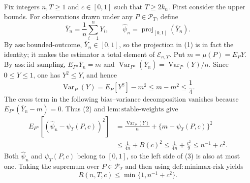 Fix integers \(n,T\geq 1\) and \(c\in[0,1]\) such that \(T\geq 2k_n\).  First consider the upper bounds.  For observations drawn under any \(P\in\mathcal P_T\), define
\[
\overline Y_n=\frac1n\sum_{i=1}^nY_i,
\qquad
\widehat\psi_n=\operatorname{proj}_{[0,1]}(\overline Y_n).
\tag{1}
\]
By \(\mathrm{ass:bounded\text{-}outcome}\), \(\overline Y_n\in[0,1]\), so the projection in (1) is in fact the identity; it makes the estimator a total element of \(\mathcal E_{n,T}\).  Put \(m=\mu(P)=E_PY\).  By \(\mathrm{ass:iid\text{-}sampling}\), \(E_{P^n}\overline Y_n=m\) and \(\operatorname{Var}_{P^n}(\overline Y_n)=\operatorname{Var}_P(Y)/n\).  Since \(0\leq Y\leq1\), one has \(Y^2\leq Y\), and hence
\[
\operatorname{Var}_P(Y)=E_P[Y^2]-m^2
\leq m-m^2\leq\frac14.
\tag{2}
\]
The cross term in the following bias--variance decomposition vanishes because \(E_{P^n}(\overline Y_n-m)=0\).  Thus (2) and \(\mathrm{lem:stable\text{-}weights}\) give
\[
\begin{aligned}
E_{P^n}\!\left[(\widehat\psi_n-\psi_T(P,c))^2\right]
&=\frac{\operatorname{Var}_P(Y)}n+\{m-\psi_T(P,c)\}^2\\
&\leq\frac1{4n}+B(c)^2
\leq\frac1{4n}+\frac{c^2}{9}
\leq n^{-1}+c^2.
\end{aligned}
\tag{3}
\]
Both \(\widehat\psi_n\) and \(\psi_T(P,c)\) belong to \([0,1]\), so the left side of (3) is also at most one.  Taking the supremum over \(P\in\mathcal P_T\) and then using \(\mathrm{def:minimax\text{-}risk}\) yields
\[
R(n,T,c)\leq\min\{1,n^{-1}+c^2\}.
\tag{4}
\]

